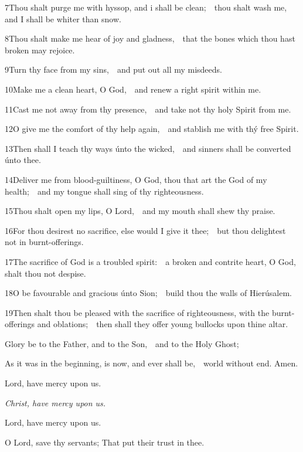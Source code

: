 7\enspace Thou shalt purge me with hyssop, and i shall be clean;\ \star\ thou shalt wash me, and I shall be whiter than snow.

8\enspace Thou shalt make me hear of joy and gladness,\ \star\ that the bones which thou hast broken may rejoice.

9\enspace Turn thy face from my sins,\ \star\ and put out all my misdeeds.

10\enspace Make me a clean heart, O God,\ \star\ and renew a right spirit within me.

11\enspace Cast me not away from thy presence,\ \star\ and take not thy holy Spirit from me.

12\enspace O give me the comfort of thy help again,\ \star\ and stablish me with thý free Spirit.

13\enspace Then shall I teach thy ways únto the wicked,\ \star\ and sinners shall be converted únto thee.

14\enspace Deliver me from blood-guiltiness, O God, thou that art the God of my health;\ \star\ and my tongue shall sing of thy righteousness.

15\enspace Thou shalt open my lips, O Lord,\ \star\ and my mouth shall shew thy praise.

16\enspace For thou desirest no sacrifice, else would I give it thee;\ \star\ but thou delightest not in burnt-offerings.

17\enspace The sacrifice of God is a troubled spirit:\ \star\ a broken and contrite heart, O God, shalt thou not despise.

18\enspace O be favourable and gracious únto Sion;\ \star\ build thou the walls of Hierúsalem.

19\enspace Then shalt thou be pleased with the sacrifice of righteousness, with the burnt-offerings and oblations;\ \star\ then shall they offer young bullocks upon thine altar.

Glory be to the Father, and to the Son,\ \star\ and to the Holy Ghost;

As it was in the beginning, is now, and ever shall be,\ \star\ world without end. Amen.

\medskip

\centerline{Lord, have mercy upon us.}
\centerline{\emph{Christ, have mercy upon us.}}
\centerline{Lord, have mercy upon us.}

\smallskip
\ourFather


\V O Lord, save thy servants; \R That put their trust in thee.

